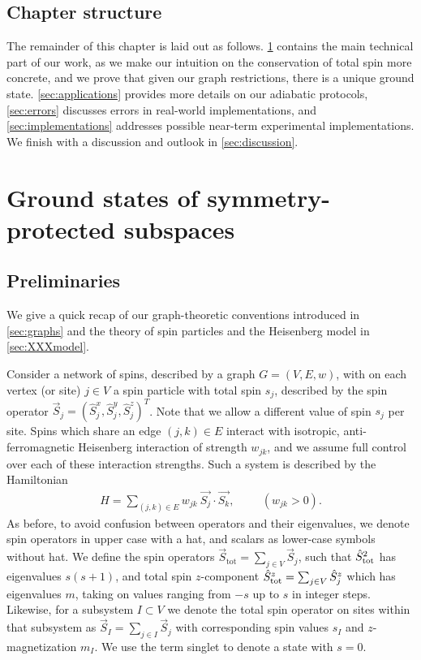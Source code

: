 \subsection{Chapter structure}
The remainder of this chapter is laid out as follows. \cref{sec:spin_encoding} contains the main technical part of our work, as we make our intuition on the conservation of total spin more concrete, and we prove that given our graph restrictions, there is a unique ground state. \cref{sec:applications} provides more details on our adiabatic protocols, \cref{sec:errors} discusses errors in real-world implementations, and \cref{sec:implementations} addresses possible near-term experimental implementations. We finish with a discussion and outlook in \cref{sec:discussion}.



\section{Ground states of symmetry-protected subspaces}
\label{sec:spin_encoding}
\subsection{Preliminaries}
We give a quick recap of our graph-theoretic conventions introduced in \cref{sec:graphs} and the theory of spin particles and the Heisenberg model in \cref{sec:XXXmodel}. 

Consider a network of spins, described by a graph $G = (V, E, w)$, with on each vertex (or site) $j \in V$ a spin particle with total spin $s_j$, described by the spin operator $\vec{S}_j = ( \hat{S}_j^x, \hat{S}_j^y, \hat{S}_j^z )^T$. Note that we allow a different value of spin $s_j$ per site. Spins which share an edge $(j,k) \in E$ interact with isotropic, anti-ferromagnetic Heisenberg interaction of strength $w_{jk}$, and we assume full control over each of these interaction strengths. Such a system is described by the Hamiltonian 
\begin{align}
H = \sum_{(j,k) \in E} w_{jk} \ \vec{S_j} \cdot \vec{S_k},  \hspace{1cm} (w_{jk} > 0).
\label{eqn:heisenberg}
\end{align}
As before, to avoid confusion between operators and their eigenvalues, we denote spin operators in upper case with a hat, and scalars as lower-case symbols without hat. We define the spin operators $\vec{S}_\text{tot} = \sum_{j \in V} \vec{S}_j$, such that ${\hat{S}_\text{tot}}^2$ has eigenvalues $s(s+1)$, and total spin  $z$-component ${\hat{S}^z_\text{tot}} = \sum_{j \in V} \hat{S}_j^z$ which has eigenvalues $m$, taking on values ranging from $-s$ up to $s$ in integer steps. Likewise, for a subsystem $I \subset V$ we denote the total spin operator on sites within that subsystem as $\vec{S}_I = \sum_{j \in I} \vec{S}_j$ with corresponding spin values $s_I$ and $z$-magnetization $m_I$. We use the term singlet to denote a state with $s=0$. 

